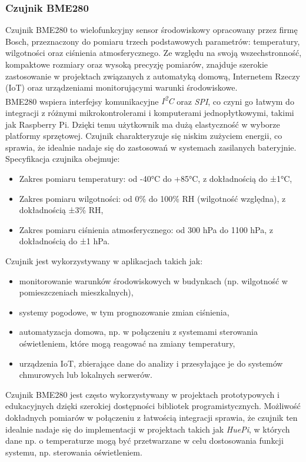 \documentclass[12pt]{article}
\begin{document}
\subsubsection{Czujnik BME280}
Czujnik BME280 to wielofunkcyjny sensor środowiskowy opracowany przez firmę Bosch, przeznaczony do pomiaru trzech podstawowych parametrów:
temperatury, wilgotności oraz ciśnienia atmosferycznego. Ze względu na swoją wszechstronność, kompaktowe rozmiary oraz wysoką precyzję pomiarów,
znajduje szerokie zastosowanie w projektach związanych z automatyką domową, Internetem Rzeczy (IoT) oraz urządzeniami monitorującymi warunki środowiskowe.\\
BME280 wspiera interfejsy komunikacyjne \textit{I\textsuperscript{2}C} oraz \textit{SPI}, co czyni go łatwym do integracji z różnymi mikrokontrolerami i komputerami jednopłytkowymi,
takimi jak Raspberry Pi. Dzięki temu użytkownik ma dużą elastyczność w wyborze platformy sprzętowej. Czujnik charakteryzuje się niskim zużyciem energii,
co sprawia, że idealnie nadaje się do zastosowań w systemach zasilanych bateryjnie.\\
Specyfikacja czujnika obejmuje:
\begin{itemize}
    \item Zakres pomiaru temperatury: od -40°C do +85°C, z dokładnością do ±1°C\cite{bme280-datasheet},
    \item Zakres pomiaru wilgotności: od 0\% do 100\% RH (wilgotność względna), z dokładnością ±3\% RH\cite{bme280-datasheet},
    \item Zakres pomiaru ciśnienia atmosferycznego: od 300 hPa do 1100 hPa, z dokładnością do ±1 hPa\cite{bme280-datasheet}.
\end{itemize}
Czujnik jest wykorzystywany w aplikacjach takich jak:
\begin{itemize}
    \item monitorowanie warunków środowiskowych w budynkach (np. wilgotność w pomieszczeniach mieszkalnych),
    \item systemy pogodowe, w tym prognozowanie zmian ciśnienia,
    \item automatyzacja domowa, np. w połączeniu z systemami sterowania oświetleniem, które mogą reagować na zmiany temperatury,
    \item urządzenia IoT, zbierające dane do analizy i przesyłające je do systemów chmurowych lub lokalnych serwerów.
\end{itemize}
Czujnik BME280 jest często wykorzystywany w projektach prototypowych i edukacyjnych dzięki szerokiej dostępności bibliotek programistycznych.
Możliwość dokładnych pomiarów w połączeniu z łatwością integracji sprawia, że czujnik ten idealnie nadaje się do implementacji w projektach
takich jak \textit{HuePi}, w których dane np. o temperaturze mogą być przetwarzane w celu dostosowania funkcji systemu, np. sterowania oświetleniem.
\end{document}
